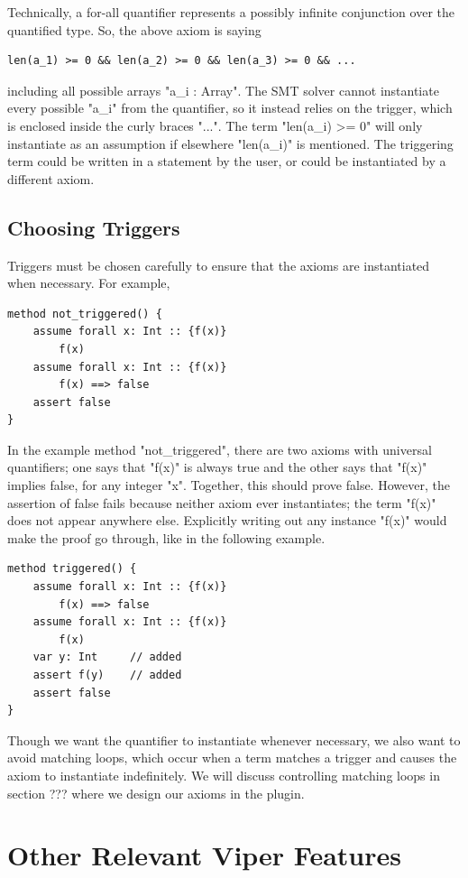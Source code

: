\documentclass[msc,oneside]{ubcthesis}
\begin{document}
Technically, a for-all quantifier represents a possibly infinite conjunction over the quantified type. So, the above axiom is saying 
\begin{lstlisting}
len(a_1) >= 0 && len(a_2) >= 0 && len(a_3) >= 0 && ...
\end{lstlisting}
including all possible arrays "a_i : Array". The SMT solver cannot instantiate every possible "a_i" from the quantifier, so it instead relies on the trigger, which is enclosed inside the curly braces "{...}". The term "len(a_i) >= 0" will only instantiate as an assumption if elsewhere "len(a_i)" is mentioned. The triggering term could be written in a statement by the user, or could be instantiated by a different axiom. 

\subsection{Choosing Triggers}
Triggers must be chosen carefully to ensure that the axioms are instantiated when necessary. For example, 
\begin{lstlisting}
method not_triggered() {
    assume forall x: Int :: {f(x)}
        f(x)
    assume forall x: Int :: {f(x)}
        f(x) ==> false
    assert false 
}
\end{lstlisting}
In the example method "not_triggered", there are two axioms with universal quantifiers; one says that "f(x)" is always true and the other says that "f(x)" implies false, for any integer "x". Together, this should prove false. However, the assertion of false fails because neither axiom ever instantiates; the term "f(x)" does not appear anywhere else. Explicitly writing out any instance "f(x)" would make the proof go through, like in the following example.
\begin{lstlisting}
method triggered() {
    assume forall x: Int :: {f(x)}
        f(x) ==> false
    assume forall x: Int :: {f(x)}
        f(x)
    var y: Int     // added
    assert f(y)    // added
    assert false 
}
\end{lstlisting}
Though we want the quantifier to instantiate whenever necessary, we also want to avoid matching loops, which occur when a term matches a trigger and causes the axiom to instantiate indefinitely. We will discuss controlling matching loops in section ??? where we design our axioms in the plugin.

\section{Other Relevant Viper Features}
\end{document}
